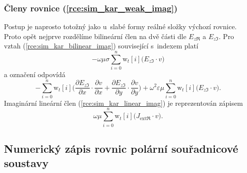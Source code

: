 \subsubsection*{Členy rovnice (\ref{rce:sim_kar_weak_imag})}
Postup je naprosto totožný jako u~slabé formy reálné složky výchozí rovnice. Proto opět nejprve rozdělíme bilineární člen na dvě části dle $E_{z\Re}$ a $E_{z\Im}$. Pro vztah (\ref{rce:sim_kar_bilinear_imag}) související s~indexem  platí
\begin{equation}
 -\omega\mu\sigma\sum_{i=0}^{n}\mathrm{w}_{t}[i]\bigg(E_{z\Im}\cdot v\bigg)
	\label{rce:sim_kar_weak_imag_real_num} 
\end{equation}
a označení  odpovídá
\begin{equation}
	-\sum_{i=0}^{n}\mathrm{w}_{t}[i]\bigg(\frac{\partial E_{z\Im}}{\partial x}\cdot \frac{\partial v}{\partial x} + \frac{\partial E_{z\Im}}{\partial y}\cdot \frac{\partial v}{\partial y} \bigg) + \omega^{2}\varepsilon\mu\sum_{i=0}^{n}\mathrm{w}_{t}[i]\bigg(E_{z\Im}\cdot v\bigg).
	\label{rce:sim_kar_weak_imag_imag_num} 
\end{equation}
Imaginární lineární člen (\ref{rce:sim_kar_linear_imag}) je reprezentován zápisem
\begin{equation}
 \omega\mu\sum_{i=0}^{n}\mathrm{w}_{t}[i]\bigg(J_{\mathrm{ext}\Re}\cdot v\bigg).
	\label{rce:sim_kar_linear_imag_num} 
\end{equation}

\subsection{Numerický zápis rovnic polární souřadnicové soustavy}
